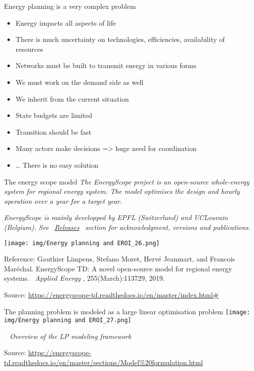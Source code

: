 \begin{frame}{Energy planning is a very complex problem}
\label{energy-planning-is-a-very-complex-problem}
\begin{itemize}
\tightlist
\item
  Energy impacts all aspects of life
\item
  There is much uncertainty on technologies, efficiencies, availability
  of resources
\item
  Networks must be built to transmit energy in various forms
\item
  We must work on the demand side as well
\item
  We inherit from the current situation
\item
  State budgets are limited
\item
  Transition should be fast
\item
  Many actors make decisions =\textgreater{} huge need for coordination
\item
  \ldots{} There is no easy solution
\end{itemize}
\end{frame}

\begin{frame}{The energy scope model}
\label{the-energy-scope-model}
{ \emph{The EnergyScope project is an open-source whole-energy system
for regional energy system. The model optimises the design and hourly
operation over a year for a target year.} }

{ \emph{EnergyScope is mainly developped by EPFL (Switzerland) and
UCLouvain (Belgium). See~} } {
\emph{\href{https://energyscope-td.readthedocs.io/en/master/sections/Releases.html}{Releases}}
} { \emph{~section for acknowledgment, versions and publications.} }

\texttt{[image: img/Energy planning and EROI\_26.png]}

{Reference: Gauthier Limpens, Stefano Moret, Hervé Jeanmart, and
Francois Maréchal. EnergyScope TD: A novel open-source model for
regional energy systems.~} { \emph{Applied Energy} } {,
255(March):113729, 2019.}

Source:
\href{https://energyscope-td.readthedocs.io/en/master/index.html}{https://energyscope-td.readthedocs.io/en/master/index.html\#}
\end{frame}

\begin{frame}{The planning problem is modeled as a large linear
optimisation problem}
\label{the-planning-problem-is-modeled-as-a-large-linear-optimisation-problem}
\texttt{[image: img/Energy planning and EROI\_27.png]}

{~} { \emph{Overview of the LP modeling framework} }

Source:
\url{https://energyscope-td.readthedocs.io/en/master/sections/Model\%20formulation.html}
\end{frame}

